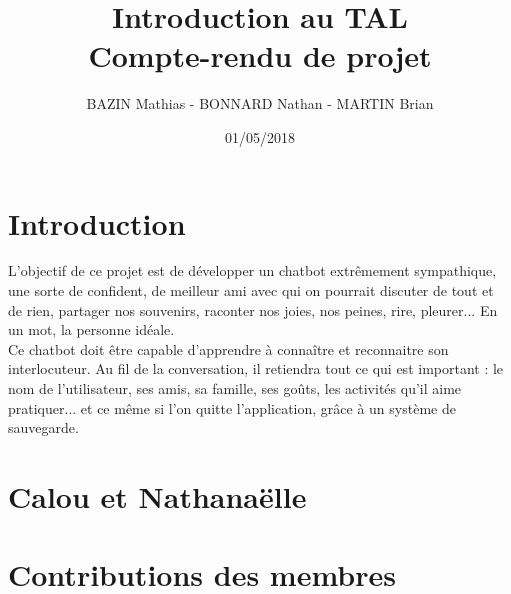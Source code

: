 \documentclass[paper=a4, fontsize=11pt]{article}
\begin{document}
\title{Introduction au TAL\\Compte-rendu de projet}
\author{BAZIN Mathias - BONNARD Nathan - MARTIN Brian}
\date{01/05/2018}
\maketitle

\section{Introduction}

L'objectif de ce projet est de développer un chatbot extrêmement sympathique, une sorte de confident, de meilleur ami avec qui on pourrait discuter de tout et de rien, partager nos souvenirs, raconter nos joies, nos peines, rire, pleurer... En un mot, la personne idéale.\\
Ce chatbot doit être capable d'apprendre à connaître et reconnaitre son interlocuteur. Au fil de la conversation, il retiendra tout ce qui est important : le nom de l'utilisateur, ses amis, sa famille, ses goûts, les activités qu'il aime pratiquer... et ce même si l'on quitte l'application, grâce à un système de sauvegarde.

\section{Calou et Nathanaëlle}

\section{Contributions des membres}
\end{document}

